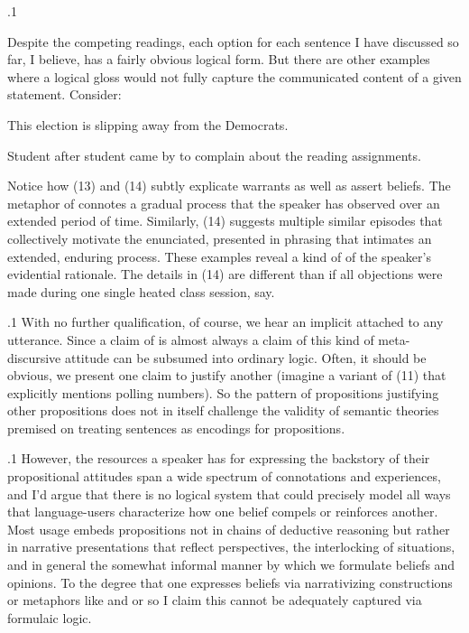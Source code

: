 \documentclass[11pt, twocolumn]{article}
\begin{document}
\p.1{%
\:\+Despite the competing readings, each option for each sentence I have discussed so
far, I believe, has a fairly obvious logical form. \>  But there are other examples where a logical
gloss would not fully capture the communicated content of a given statement. \>  Consider:

\begin{exsGroup}

\exsItem{}  \>  This election is slipping away from the Democrats. {\sssm}

\exsItem{}  \>  Student after student came by to complain about the reading assignments. \> 

\end{exsGroup}

\nip{}%
Notice how \exsRef(13) and \exsRef(14) subtly explicate warrants as well as assert beliefs. \> 
The metaphor of  connotes a
gradual process that the speaker has observed over an extended period of time. \>  Similarly,
\exsRef(14) suggests multiple similar episodes that collectively motivate the enunciated,
presented in phrasing that intimates an extended,
enduring process. \>  These examples reveal a kind of  of the speaker's evidential
rationale. \>  The details in \exsRef(14) are different than if all objections were made during one
single heated class session, say.\<\;
}%

\p.1{%
\:\+With no further qualification, of course, we
hear an implicit  attached to any utterance. \>  Since a
claim of  is almost always a claim of  this kind of
meta-discursive attitude can be subsumed into ordinary logic. \> 
Often, it should be obvious, we present one claim to justify another
(imagine a variant of \exsRef(11) that explicitly mentions polling numbers). \> 
So the pattern of propositions justifying other propositions
does not in itself challenge the validity of semantic theories
premised on treating sentences as encodings for propositions.\<\;
}%

\p.1{%
\:\+However, the resources a speaker has for expressing the backstory of their
propositional attitudes span a wide spectrum of connotations and experiences,
and I'd argue that there is no logical system that could precisely model
all ways that language-users characterize how one belief compels
or reinforces another. \> Most usage embeds propositions not in
chains of deductive reasoning but rather in narrative presentations
that reflect perspectives, the interlocking of situations, and
in general the somewhat informal manner by which
we formulate beliefs and opinions. \>  To the degree that one
expresses beliefs via narrativizing constructions or metaphors like
 and  \mdash{} or so I claim \mdash{} this
 cannot be adequately captured via formulaic logic.\<\;
}%
\end{document}
